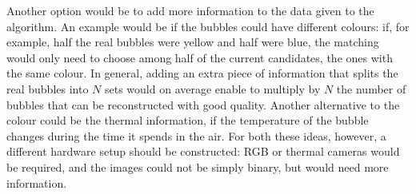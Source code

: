 Another option would be to add more information to the data given to the \match* algorithm.
An example would be if the bubbles could have different colours: if, for example, half the real bubbles were yellow and half were blue, the matching would only need to choose among half of the current candidates, the ones with the same colour.
In general, adding an extra piece of information that splits the real bubbles into $N$ sets would on average enable to multiply by $N$ the number of bubbles that can be reconstructed with good quality.
Another alternative to the colour could be the thermal information, if the temperature of the bubble changes during the time it spends in the air.
For both these ideas, however, a different hardware setup should be constructed: RGB or thermal cameras would be required, and the images could not be simply binary, but would need more information.
